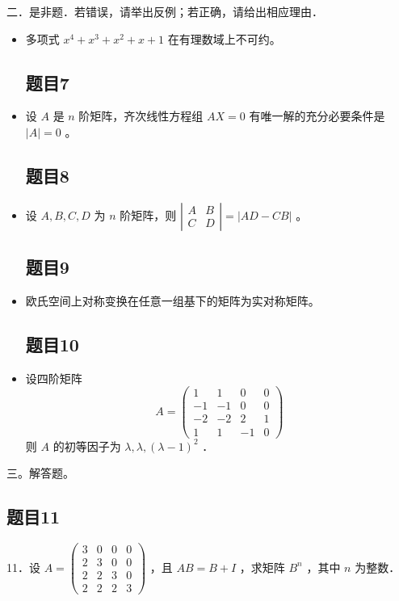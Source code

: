 \documentclass{article}
\begin{document}
二．是非题．若错误，请举出反例；若正确，请给出相应理由．

\begin{itemize}

\subsection{题目6}
  \item[6．] 多项式 \(x^{4}+x^{3}+x^{2}+x+1\) 在有理数域上不可约。

\subsection{题目7}
  \item[7．] 设 \(A\) 是 \(n\) 阶矩阵，齐次线性方程组 \(A X=0\) 有唯一解的充分必要条件是 \(|A|=0\) 。

\subsection{题目8}
  \item[8．] 设 \(A, B, C, D\) 为 \(n\) 阶矩阵，则 \(\left|\begin{array}{cc}A & B \\ C & D\end{array}\right|=|A D-C B|\) 。

\subsection{题目9}
  \item[9．] 欧氏空间上对称变换在任意一组基下的矩阵为实对称矩阵。

\subsection{题目10}
  \item[10．] 设四阶矩阵
\[
A=\left(\begin{array}{cccc}
1 & 1 & 0 & 0 \\
-1 & -1 & 0 & 0 \\
-2 & -2 & 2 & 1 \\
1 & 1 & -1 & 0
\end{array}\right)
\]
则 \(A\) 的初等因子为 \(\lambda, \lambda,(\lambda-1)^{2}\) ．
\end{itemize}

三。解答题。\\

\subsection{题目11}
11．设 \(A=\left(\begin{array}{llll}3 & 0 & 0 & 0 \\ 2 & 3 & 0 & 0 \\ 2 & 2 & 3 & 0 \\ 2 & 2 & 2 & 3\end{array}\right)\) ，且 \(A B=B+I\) ，求矩阵 \(B^{n}\) ，其中 \(n\) 为整数．
\end{document}
